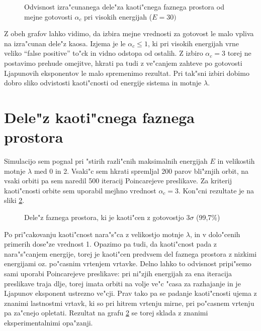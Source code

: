 \documentclass[a4paper,10pt]{article}
\begin{document}
\begin{figure}[H]
 
 \caption{Odvisnost izra"cunanega dele"za kaoti"cnega faznega prostora od mejne gotovosti $\alpha_c$ pri visokih energijah ($E=30)$}
 \label{fig:gotovost-30}
\end{figure}

Z obeh grafov lahko vidimo, da izbira mejne vrednosti za gotovost le malo vpliva na izra"cunan dele"z kaosa. Izjema je le $\alpha_c \leq 1$, ki pri visokih energijah vrne veliko ``false positive'' to"ck in vidno odstopa od ostalih. Z izbiro $\alpha_c = 3$ torej ne postavimo prehude omejitve, hkrati pa tudi z ve"canjem zahteve po gotovosti Ljapunovih eksponentov le malo spremenimo rezultat. Pri tak"sni izbiri dobimo dobro sliko odvistosti kaoti"cnosti od energije sistema in motnje $\lambda$. 


\section{Dele"z kaoti"cnega faznega prostora}
Simulacijo sem pognal pri "stirih razli"cnih maksimalnih energijah $E$ in velikostih motnje $\lambda$ med 0 in 2. Vsaki"c sem hkrati spremljal 200 parov bli"znjih orbit, na vsaki orbiti pa sem naredil 500 iteracij Poincarejeve preslikave. Za kriterij kaoti"cnosti orbite sem uporabil mejhno vrednost $\alpha_c=3$. Kon"cni rezultate je na sliki \ref{fig:kaos}. 

\begin{figure}[H]
 \label{fig:kaos}
 
  \caption{Dele"z faznega prostora, ki je kaoti"cen z gotovostjo $3\sigma$ (99,7\%)}
\end{figure}

Po pri"cakovanju kaoti"cnost nara"s"ca z velikostjo motnje $\lambda$, in v dolo"cenih primerih dose"ze vrednost 1. Opazimo pa tudi, da kaoti"cnost pada z nara"s"canjem energije, torej je kaoti"cen predvsem del faznega prostora z nizkimi energijami oz. po"casnim vrtenjem vrtavke. Delno lahko to odvisnost pripi"semo sami uporabi Poincarejeve preslikave: pri ni"zjih energijah za ena iteracija preslikave traja dlje, torej imata orbiti na volje ve"c "casa za razhajanje in je Ljapunov eksponent ustrezno ve"cji. Prav tako pa se padanje kaoti"cnosti ujema z znanimi lastnostmi vrtavk, ki so pri hitrem vrtenju mirne, pri po"casnem vrtenju pa za"cnejo opletati. Rezultat na grafu \ref{fig:kaos} se torej sklada z znanimi eksperimentalnimi opa"zanji. 
\end{document}
